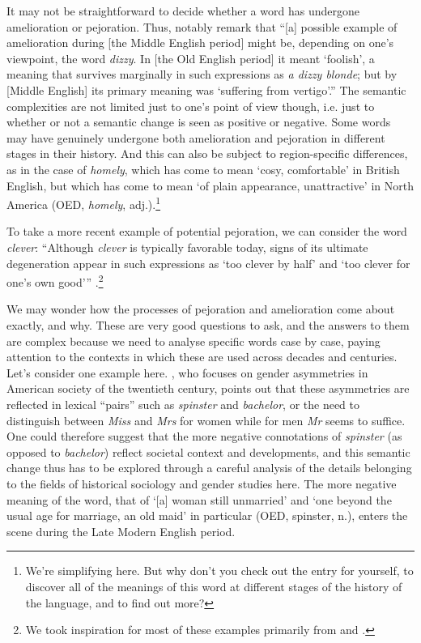 It may not be straightforward to decide whether a word has undergone amelioration or pejoration. Thus, \citet[205]{MillHay2018} notably remark that ``[a] possible example of amelioration during [the Middle English period] might be, depending on one's viewpoint, the word \textit{dizzy}. In [the Old English period] it meant `foolish', a meaning that survives marginally in such expressions as \textit{a dizzy blonde}; but by [Middle English] its primary meaning was `suffering from vertigo'.'' The semantic complexities are not limited just to one's point of view though, i.e. just to whether or not a semantic change is seen as positive or negative. Some words may have genuinely undergone both amelioration and pejoration in different stages in their history. And this can also be subject to region-specific differences, as in the case of \textit{homely}, which has come to mean `cosy, comfortable' in British English, but which has come to mean `of plain appearance, unattractive' in North America (OED,  \emph{homely}, adj.).\footnote{We're simplifying here. But why don't you check out the entry for yourself, to discover all of the meanings of this word at different stages of the history of the language, and to find out more?}

To take a more recent example of potential pejoration, we can consider the word \textit{clever}: ``Although \textit{clever} is typically favorable today, signs of its ultimate degeneration appear in such expressions as `too clever by half' and `too clever for one's own good'{''} \citep[289]{MillHay2018}.\footnote{We took inspiration for most of these examples primarily from \citet{Campbell2013} and \citet[205 and 289]{MillHay2018}.}

We may wonder how the processes of pejoration and amelioration come about exactly, and why. These are very good questions to ask, and the answers to them are complex because we need to analyse specific words case by case, paying attention to the contexts in which these are used across decades and centuries. Let's consider one example here. \citet{Lakoff1973}, who focuses on gender asymmetries in American society of the twentieth century, points out that these asymmetries are reflected in lexical ``pairs'' such as \textit{spinster} and \textit{bachelor}, or the need to distinguish between \textit{Miss} and \textit{Mrs} for women while for men \textit{Mr} seems to suffice. One could therefore suggest that the more negative connotations of \textit{spinster} (as opposed to \textit{bachelor}) reflect societal context and developments, and this semantic change thus has to be explored through a careful analysis of the details belonging to the fields of historical sociology and gender studies here. The more negative meaning of the word, that of `[a] woman still unmarried' and `one beyond the usual age for marriage, an old maid' in particular (OED,  spinster, n.), enters the scene during the Late Modern English period.


